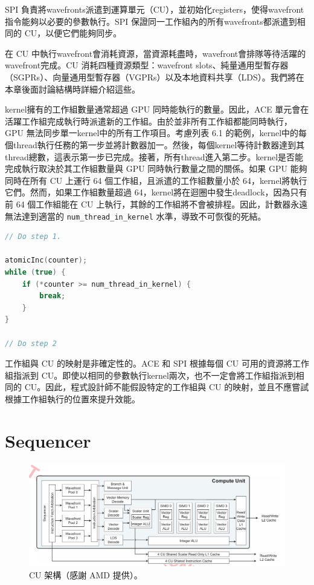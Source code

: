 \vspace{1em}
SPI 負責將wavefronts派遣到運算單元（CU），並初始化registers，使得wavefront指令能夠以必要的參數執行。SPI 保證同一工作組內的所有wavefronts都派遣到相同的 CU，以便它們能夠同步。

\vspace{1em}
在 CU 中執行wavefront會消耗資源，當資源耗盡時，wavefront會排隊等待活躍的wavefront完成。CU 消耗四種資源類型：wavefront slots、純量通用型暫存器（SGPRs）、向量通用型暫存器（VGPRs）以及本地資料共享（LDS）。我們將在本章後面討論結構時詳細介紹這些。

\vspace{1em}
kernel擁有的工作組數量通常超過 GPU 同時能執行的數量。因此，ACE 單元會在活躍工作組完成執行時派遣新的工作組。由於並非所有工作組都能同時執行，GPU 無法同步單一kernel中的所有工作項目。考慮列表 6.1 的範例，kernel中的每個thread執行任務的第一步並將計數器加一。然後，每個kernel等待計數器達到其thread總數，這表示第一步已完成。接著，所有thread進入第二步。kernel是否能完成執行取決於其工作組數量與 GPU 同時執行數量之間的關係。如果 GPU 能夠同時在所有 CU 上運行 64 個工作組，且派遣的工作組數量小於 64，kernel將執行它們。然而，如果工作組數量超過 64，kernel將在迴圈中發生deadlock，因為只有前 64 個工作組能在 CU 上執行，其餘的工作組將不會被排程。因此，計數器永遠無法達到適當的 \texttt{num\_thread\_in\_kernel} 水準，導致不可恢復的死結。

\lstset{style=mystyle}
\begin{lstlisting}[language=c++,caption={deadlock範例程式碼。計數器定義為一個volatile指標，並初始化為零。}]
// Do step 1.

atomicInc(counter);
while (true) {
    if (*counter >= num_thread_in_kernel) {
        break;
    }
}

// Do step 2
\end{lstlisting}

\vspace{1em}
工作組與 CU 的映射是非確定性的。ACE 和 SPI 根據每個 CU 可用的資源將工作組指派到 CU。即使以相同的參數執行kernel兩次，也不一定會將工作組指派到相同的 CU。因此，程式設計師不能假設特定的工作組與 CU 的映射，並且不應嘗試根據工作組執行的位置來提升效能。

\section{Sequencer}
\label{sec:sequencer}
\begin{figure}
    \centering
    \includegraphics[width=1\linewidth]{FileAusiliari//Screenshots/Figure6-2.png}
    \caption{CU 架構（感謝 AMD 提供）。}
    \label{fig:enter-label}
\end{figure}

